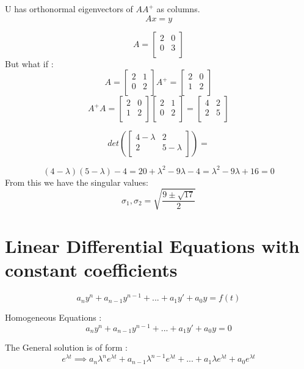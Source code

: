 \documentclass{article}
\newcommand{\lm}{\lambda}
\begin{document}
 U has orthonormal eigenvectors of $AA^+$ as columns.\\

$$ Ax = y $$ 

$$A=  \begin{bmatrix}
2 & 0\\
0 &3  \\
\end{bmatrix}
$$
But what if :
$$A=  \begin{bmatrix}
2 & 1\\
0 &2  \\
\end{bmatrix}
A^+ =  \begin{bmatrix}
2 & 0\\
1 &2  \\
\end{bmatrix}$$
$$
A^+A = \begin{bmatrix}
2 & 0\\
1 &2  \\
\end{bmatrix}
\begin{bmatrix}
2 & 1\\
0 &2 \\
\end{bmatrix}
=\begin{bmatrix}
4 & 2\\
2&5  \\
\end{bmatrix}
$$

$$ det(\begin{bmatrix}
4-\lambda& 2\\
2 &5- \lambda  \\
\end{bmatrix})
=$$

$$ (4-\lambda)(5-\lambda)-4  =20 + \lambda^2-9\lambda-4 = \lambda^2 - 9\lambda+16=0$$
From this we have the singular values:
$$ \sigma_1, \sigma_2 = \sqrt{\frac{9\pm\sqrt{17}}{2}}$$

\section {Linear Differential Equations with constant coefficients}
$$ a_n y^n + a_{n-1}y^{n-1} + ... + a_1 y' + a_0 y = f(t) $$

Homogeneous Equations :\\

$$a_n y^n + a_{n-1}y^{n-1} + ... + a_1 y' + a_0 y = 0$$

The General solution is of form :\\
$$ e^{\lm t} \implies a_n \lm^n  e^{\lm t} +  a_{n-1}\lm^{n-1}e^{\lm t}+... + a_1 \lm e^{\lm t} + a_0 e^{\lm t} $$
\end{document}
